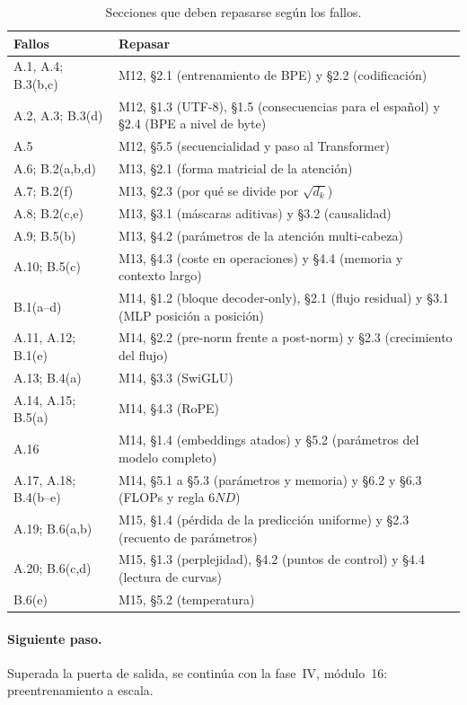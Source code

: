 \begin{table}[ht]
\centering\small
\caption{Secciones que deben repasarse según los fallos.}\label{tab:repaso}
\begin{tabularx}{\textwidth}{@{}>{\raggedright\arraybackslash}p{4.3cm}X@{}}
\toprule
Fallos & Repasar \\
\midrule
A.1, A.4; B.3(b,c) & M12, §2.1 (entrenamiento de BPE) y §2.2 (codificación) \\
A.2, A.3; B.3(d) & M12, §1.3 (UTF-8), §1.5 (consecuencias para el español) y §2.4 (BPE a nivel de byte) \\
A.5 & M12, §5.5 (secuencialidad y paso al Transformer) \\
A.6; B.2(a,b,d) & M13, §2.1 (forma matricial de la atención) \\
A.7; B.2(f) & M13, §2.3 (por qué se divide por $\sqrt{d_k}$) \\
A.8; B.2(c,e) & M13, §3.1 (máscaras aditivas) y §3.2 (causalidad) \\
A.9; B.5(b) & M13, §4.2 (parámetros de la atención multi-cabeza) \\
A.10; B.5(c) & M13, §4.3 (coste en operaciones) y §4.4 (memoria y contexto largo) \\
B.1(a--d) & M14, §1.2 (bloque decoder-only), §2.1 (flujo residual) y §3.1 (MLP posición a posición) \\
A.11, A.12; B.1(e) & M14, §2.2 (pre-norm frente a post-norm) y §2.3 (crecimiento del flujo) \\
A.13; B.4(a) & M14, §3.3 (SwiGLU) \\
A.14, A.15; B.5(a) & M14, §4.3 (RoPE) \\
A.16 & M14, §1.4 (embeddings atados) y §5.2 (parámetros del modelo completo) \\
A.17, A.18; B.4(b--e) & M14, §5.1 a §5.3 (parámetros y memoria) y §6.2 y §6.3 (FLOPs y regla $6ND$) \\
A.19; B.6(a,b) & M15, §1.4 (pérdida de la predicción uniforme) y §2.3 (recuento de parámetros) \\
A.20; B.6(c,d) & M15, §1.3 (perplejidad), §4.2 (puntos de control) y §4.4 (lectura de curvas) \\
B.6(e) & M15, §5.2 (temperatura) \\
\bottomrule
\end{tabularx}
\end{table}

\paragraph{Siguiente paso.} Superada la puerta de salida, se continúa con la fase~IV, módulo~16: preentrenamiento a escala.
